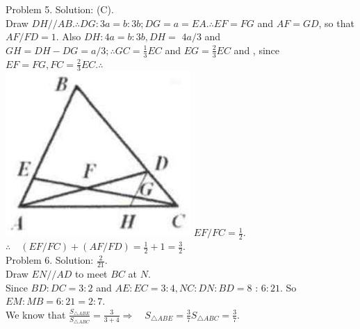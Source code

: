 \documentclass[10pt]{article}
\begin{document}
Problem 5. Solution: (C).\\
Draw \(D H / / A B . \therefore D G: 3 a=b: 3 b ; D G=a=E A . \therefore E F=F G\) and \(A F=G D\), so that \(A F / F D=1\). Also \(D H: 4 a=b: 3 b, D H=\) \(4 a / 3\) and \(G H=D H-D G=a / 3 ; \therefore G C=\frac{1}{3} E C\) and \(E G=\frac{2}{3} E C\) and , since \(E F=F G, F C=\frac{2}{3} E C . \therefore\)\\
\includegraphics[max width=\textwidth]{2025_04_17_97bc1f7e44d93c271a88g-133(1)} \(E F / F C=\frac{1}{2}\).\\
\(\therefore \quad(E F / F C)+(A F / F D)=\frac{1}{2}+1=\frac{3}{2}\).\\
Problem 6. Solution: \(\frac{2}{21}\).\\
Draw \(E N / / A D\) to meet \(B C\) at \(N\).\\
Since \(B D: D C=3: 2\) and \(A E: E C=3: 4, N C: D N: B D=8\) : \(6: 21\). So \(E M: M B=6: 21=2: 7\).\\
We know that \(\frac{S_{\triangle A B E}}{S_{\triangle A B C}}=\frac{3}{3+4} \Rightarrow \quad S_{\triangle A B E}=\frac{3}{7} S_{\triangle A B C}=\frac{3}{7}\).\\
\end{document}
